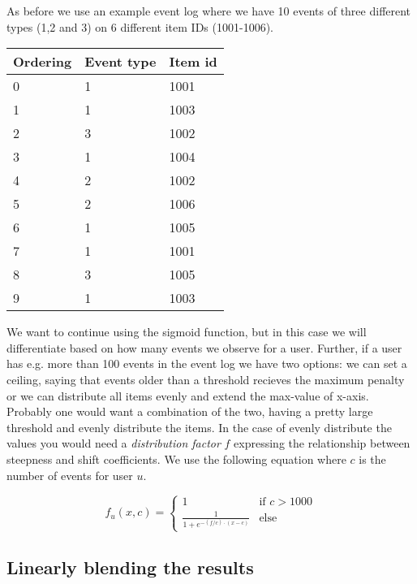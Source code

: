 As before we use an example event log where we have 10 events of three
different types (1,2 and 3) on 6 different item IDs (1001-1006).

\begin{table}
  \centering
  \label{event-log-sigmoid-count}
  \begin{tabular}{lll}
    \toprule
    Ordering & Event type & Item id \\
    \midrule
    0 & 1 & 1001 \\
    1 & 1 & 1003 \\
    2 & 3 & 1002 \\
    3 & 1 & 1004 \\
    4 & 2 & 1002 \\
    5 & 2 & 1006 \\
    6 & 1 & 1005 \\
    7 & 1 & 1001 \\
    8 & 3 & 1005 \\
    9 & 1 & 1003 \\
    \bottomrule
  \end{tabular}
\end{table}

We want to continue using the sigmoid function, but in this case we will
differentiate based on how many events we observe for a user. Further, if a
user has e.g. more than 100 events in the event log we have two options: we can
set a ceiling, saying that events older than a threshold recieves the maximum
penalty or we can distribute all items evenly and extend the max-value of
x-axis. Probably one would want a combination of the two, having a pretty large
threshold and evenly distribute the items. In the case of evenly distribute the
values you would need a \textit{distribution factor} $f$ expressing the
relationship between steepness and shift coefficients. We use the following
equation where $c$ is the number of events for user $u$.

\begin{equation}
  f_{u}(x, c) = 
    \begin{cases}
      1               & \text{if } c > 1000 \\
      \frac{1}{1+e^{-(f/c) \cdot (x - c)}} & \text{else }
    \end{cases}
\end{equation}

\subsection{Linearly blending the results}
